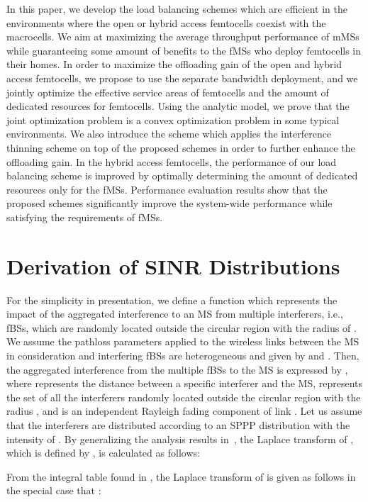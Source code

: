 \documentclass[journal]{IEEEtran}
\begin{document}
In this paper, we develop the load balancing schemes which are efficient in
the environments where the open or hybrid access femtocells coexist with the macrocells.
We aim at maximizing the average throughput
performance of
mMSs while guaranteeing some amount of benefits to the
fMSs who deploy femtocells in their homes.
In order to maximize the offloading gain of the open and hybrid access femtocells, we propose
to use the separate bandwidth deployment, and we jointly optimize the
effective service areas of femtocells
and the amount of dedicated resources for femtocells.
Using the analytic model, we prove that the joint optimization problem is a convex optimization problem
in some typical environments.
We also introduce the scheme which  applies the interference thinning scheme on top of the proposed schemes
in order to further enhance  the offloading gain.
In the hybrid access femtocells, the performance of our load balancing scheme is
improved by optimally determining the amount of dedicated resources only for the fMSs.
Performance evaluation results show that the proposed schemes significantly improve the system-wide
performance while satisfying the requirements of fMSs.







\appendices
\section{Derivation of SINR Distributions}
For the simplicity in presentation, we define a function which represents
the impact of the
aggregated interference to an MS from multiple interferers, i.e., fBSs, which are randomly located
outside the circular region with the radius of .
We assume the pathloss parameters applied to the wireless links
between the MS in consideration and interfering fBSs are heterogeneous and given by
 and  . Then,
the aggregated interference from the multiple fBSs to the MS is expressed by
,
where  represents the distance between a specific interferer and the MS,
 represents the set of all the interferers randomly located
outside the circular region with the radius , and  is an independent
Rayleigh fading component of link .
Let us assume that the  interferers are distributed according
to an SPPP distribution with the intensity of .
By generalizing the analysis results in~\cite{tcom11andrews}, the Laplace transform of , which is defined by
,
is calculated as follows:

From the integral table found in \cite{book07Gradshtein},
the Laplace transform of  is given as follows in the special case that :
\end{document}
